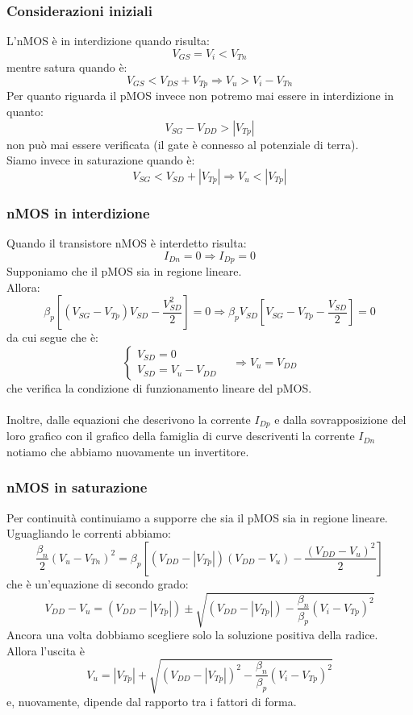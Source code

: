 \documentclass[../main.tex]{subfiles}
\begin{document}
	\subsubsection{Considerazioni iniziali}
	L'nMOS è in interdizione quando risulta:
	$$V_{GS} = V_i < V_{Tn}$$
	mentre satura quando è:
	$$V_{GS} < V_{DS} + V_{Tp} \Longrightarrow V_u > V_i - V_{Tn}$$
	Per quanto riguarda il pMOS invece non potremo mai essere in interdizione in quanto:
	$$V_{SG} - V_{DD} > |V_{Tp}|$$
	non può mai essere verificata (il gate è connesso al potenziale di terra).\\
	Siamo invece in saturazione quando è:
	$$V_{SG} < V_{SD} + |V_{Tp}| \Longrightarrow V_u < |V_{Tp}|$$
	\subsubsection{nMOS in interdizione}
	Quando il transistore nMOS è interdetto risulta:
	$$I_{Dn} = 0 \Longrightarrow I_{Dp} = 0$$
	Supponiamo che il pMOS sia in regione lineare.\\
	Allora:
	$$\beta_p \left[ (V_{SG} - V_{Tp}) V_{SD} - \frac{V_{SD}^2}{2} \right] = 0 \Longrightarrow \beta_p V_{SD} \left[ V_{SG} - V_{Tp} - \frac{V_{SD}}{2} \right] = 0$$
	da cui segue che è:
	$$\begin{cases} V_{SD} = 0 \\ V_{SD} = V_u - V_{DD} \end{cases} \quad \Longrightarrow V_u = V_{DD}$$
	che verifica la condizione di funzionamento lineare del pMOS.\\\\
	Inoltre, dalle equazioni che descrivono la corrente $I_{Dp}$ e dalla sovrapposizione del loro grafico con il grafico della famiglia di curve descriventi la corrente $I_{Dn}$ notiamo che abbiamo nuovamente un invertitore.
	\subsubsection{nMOS in saturazione}
	Per continuità continuiamo a supporre che sia il pMOS sia in regione lineare.\\
	Uguagliando le correnti abbiamo:
	$$\frac{\beta_n}{2} (V_u - V_{Tn})^2 = \beta_p \left[ (V_{DD} - |V_{Tp}|) (V_{DD} - V_u) - \frac{(V_{DD} - V_u)^2}{2} \right]$$
	che è un’equazione di secondo grado:
	$$V_{DD} - V_u = (V_{DD} - |V_{Tp}|) \pm \sqrt{(V_{DD} - |V_{Tp}|) - \frac{\beta_n}{\beta_p}(V_i - V_{Tp})^2}$$
	Ancora una volta dobbiamo scegliere solo la soluzione positiva della radice.\\
	Allora l’uscita è
	$$V_u = |V_{Tp}| + \sqrt{(V_{DD} - |V_{Tp}|)^2 - \frac{\beta_n}{\beta_p}(V_i - V_{Tp})^2}$$
	e, nuovamente, dipende dal rapporto tra i fattori di forma.
\end{document}
